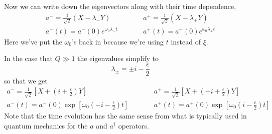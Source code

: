 \documentclass{article}
\begin{document}
Now we can write down the eigenvectors along with their time dependence, \begin{eqnarray}
a^- = \frac{1}{\sqrt{2}}\left( X -\lambda_- Y \right) &\qquad&
a^+ = \frac{1}{\sqrt{2}}\left( X -\lambda_+ Y \right) \\
a^-(t) = a^-(0) e^{\omega_0 \lambda_- t} &\qquad& a^+(t) = a^+(0) e^{\omega_0 \lambda_+ t} \end{eqnarray}
Here we've put the $\omega_0$'s back in because we're using $t$ instead of $\xi$.

In the case that $Q \gg 1$ the eigenvalues simplify to \begin{equation}
\lambda_{\pm} = \pm i -\frac{\epsilon}{2} \end{equation}
so that we get \begin{eqnarray}
a^- = \frac{1}{\sqrt{2}}\left[ X + \left( i + \frac{\epsilon}{2} \right) Y \right] &\qquad&
a^+ = \frac{1}{\sqrt{2}}\left[ X + \left(-i + \frac{\epsilon}{2} \right) Y \right] \\
a^-(t) = a^-(0) \exp \left[ \omega_0 \left(-i - \frac{\epsilon}{2}\right) t \right]
& \qquad &
a^+(t) = a^+(0) \exp \left[ \omega_0 \left( i - \frac{\epsilon}{2}\right) t \right] \end{eqnarray}
Note that the time evolution has the same sense from what is typically used in quantum mechanics for the $a$ and $a^{\dagger}$ operators.
\end{document}
